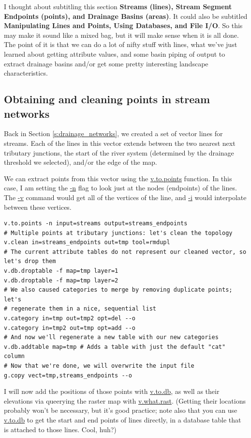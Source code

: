 \documentclass{book}
\begin{document}
I thought about subtitling this section \textbf{Streams (lines), Stream Segment Endpoints (points), and Drainage Basins (areas)}. It could also be subtitled \textbf{Manipulating Lines and Points, Using Databases, and File I/O}. So this may make it sound like a mixed bag, but it will make sense when it is all done. The point of it is that we can do a lot of nifty stuff with lines, what we've just learned about getting attribute values, and some basin piping of output to extract drainage basins and/or get some pretty interesting landscape characteristics.

\subsection{Obtaining and cleaning points in stream networks}

Back in Section \ref{s:drainage_networks}, we created a set of vector lines for streams. Each of the lines in this vector extends between the two nearest next tributary junctions, the start of the river system (determined by the drainage threshold we selected), and/or the edge of the map.

We can extract points from this vector using the \url{v.to.points} function. In this case, I am setting the \url{-n} flag to look just at the nodes (endpoints) of the lines. The \url{-v} command would get all of the vertices of the line, and \url{-i} would interpolate between these vertices.

\begin{lstlisting}
v.to.points -n input=streams output=streams_endpoints
# Multiple points at tributary junctions: let's clean the topology
v.clean in=streams_endpoints out=tmp tool=rmdupl
# The current attribute tables do not represent our cleaned vector, so let's drop them
v.db.droptable -f map=tmp layer=1
v.db.droptable -f map=tmp layer=2
# We also caused categories to merge by removing duplicate points; let's
# regenerate them in a nice, sequential list
v.category in=tmp out=tmp2 opt=del --o
v.category in=tmp2 out=tmp opt=add --o
# And now we'll regenerate a new table with our new categories
v.db.addtable map=tmp # Adds a table with just the default "cat" column
# Now that we're done, we will overwrite the input file
g.copy vect=tmp,streams_endpoints --o
\end{lstlisting}

I will now add the positions of those points with \url{v.to.db}, as well as their elevations via queerying the raster map with \url{v.what.rast}. (Getting their locations probably won't be necessary, but it's good practice; note also that you can use \url{v.to.db} to get the start and end points of lines directly, in a database table that is attached to those lines. Cool, huh?)
\end{document}
